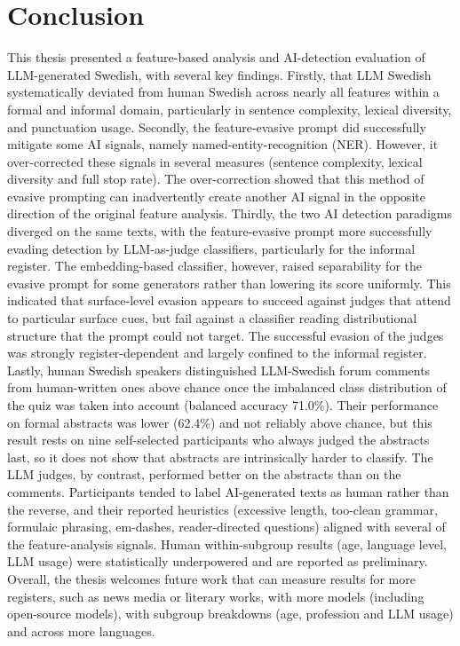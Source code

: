 \documentclass[thesis]{cluu}
\begin{document}
\chapter{Conclusion}
This thesis presented a feature-based analysis and AI-detection evaluation of LLM-generated Swedish, with several key findings. Firstly, that LLM Swedish systematically deviated from human Swedish across nearly all features within a formal and informal domain, particularly in sentence complexity, lexical diversity, and punctuation usage. Secondly, the feature-evasive prompt did successfully mitigate some AI signals, namely named-entity-recognition (NER). However, it over-corrected these signals in several measures (sentence complexity, lexical diversity and full stop rate). The over-correction showed that this method of evasive prompting can inadvertently create another AI signal in the opposite direction of the original feature analysis. Thirdly, the two AI detection paradigms diverged on the same texts, with the feature-evasive prompt more successfully evading detection by LLM-as-judge classifiers, particularly for the informal register. The embedding-based classifier, however, raised separability for the evasive prompt for some generators rather than lowering its score uniformly. This indicated that surface-level evasion appears to succeed against judges that attend to particular surface cues, but fail against a classifier reading distributional structure that the prompt could not target. The successful evasion of the judges was strongly register-dependent and largely confined to the informal register. Lastly, human Swedish speakers distinguished LLM-Swedish forum comments from human-written ones above chance once the imbalanced class distribution of the quiz was taken into account (balanced accuracy 71.0\%). Their performance on formal abstracts was lower (62.4\%) and not reliably above chance, but this result rests on nine self-selected participants who always judged the abstracts last, so it does not show that abstracts are intrinsically harder to classify. The LLM judges, by contrast, performed better on the abstracts than on the comments. Participants tended to label AI-generated texts as human rather than the reverse, and their reported heuristics (excessive length, too-clean grammar, formulaic phrasing, em-dashes, reader-directed questions) aligned with several of the feature-analysis signals. Human within-subgroup results (age, language level, LLM usage) were statistically underpowered and are reported as preliminary. Overall, the thesis welcomes future work that can measure results for more registers, such as news media or literary works, with more models (including open-source models), with subgroup breakdowns (age, profession and LLM usage) and across more languages.
\end{document}
